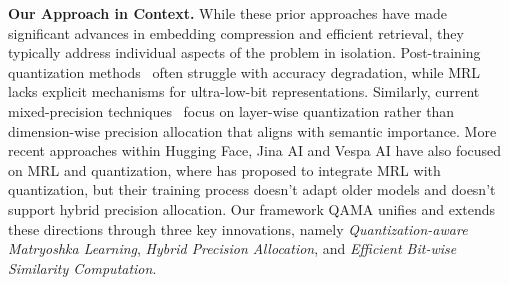 \textbf{Our Approach in Context.}
While these prior approaches have made significant advances in embedding compression and efficient retrieval, they typically address individual aspects of the problem in isolation. 
Post-training quantization methods~\cite{jacob2018quantization} often struggle with accuracy degradation, while MRL~\cite{kusupati2021matryoshka} lacks explicit mechanisms for ultra-low-bit representations. 
Similarly, current mixed-precision techniques~\cite{dong2019hawq} focus on layer-wise quantization rather than dimension-wise precision allocation that aligns with semantic importance. More recent approaches within Hugging Face, Jina AI and Vespa AI \cite{hf2024quantization, vespa2024matryoshka, jina2024binary} have also focused on MRL and quantization, where \cite{vespa2024matryoshka} has proposed to integrate MRL with quantization, but their training process doesn't adapt older models and doesn't support hybrid precision allocation.
Our framework QAMA unifies and extends these directions through three key innovations, namely \emph{Quantization-aware Matryoshka Learning}, \emph{Hybrid Precision Allocation}, and \emph{Efficient Bit-wise Similarity Computation}.
    
    
